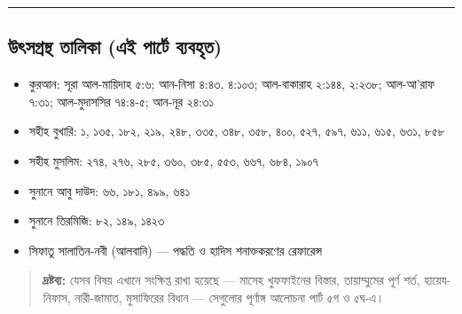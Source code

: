 \medskip\hrule\medskip

\subsection*{উৎসগ্রন্থ তালিকা (এই পার্টে ব্যবহৃত)}

\begin{itemize}
\item কুরআন: সূরা আল-মায়িদাহ ৫:৬; আন-নিসা ৪:৪৩, ৪:১০৩; আল-বাকারাহ ২:১৪৪, ২:২৩৮; আল-আ'রাফ ৭:৩১; আল-মুদাসসির ৭৪:৪-৫; আন-নূর ২৪:৩১
\item সহীহ বুখারি: ১, ১৩৫, ১৮২, ২১৯, ২৪৮, ৩৩৫, ৩৪৮, ৩৫৮, ৪০০, ৫২৭, ৫৯৭, ৬১১, ৬১৫, ৬৩১, ৮৫৮
\item সহীহ মুসলিম: ২৭৪, ২৭৬, ২৮৫, ৩৬০, ৩৮৫, ৫৫৩, ৬৬৭, ৬৮৪, ১৯০৭
\item সুনানে আবু দাউদ: ৬৬, ১৮১, ৪৯৯, ৬৪১
\item সুনানে তিরমিজি: ৮২, ১৪৯, ১৪২৩
\item সিফাতু সালাতিন-নবী (আলবানি) — পদ্ধতি ও হাদিস শনাক্তকরণের রেফারেন্স
\end{itemize}
\begin{quote}
\textbf{দ্রষ্টব্য:} যেসব বিষয় এখানে সংক্ষিপ্ত রাখা হয়েছে — মাসেহ খুফফাইনের বিস্তার, তায়াম্মুমের পূর্ণ শর্ত, হায়েয-নিফাস, নারী-জামাত, মুসাফিরের বিধান — সেগুলোর পূর্ণাঙ্গ আলোচনা পার্ট ৫গ ও ৫ঘ-এ।
\end{quote}



